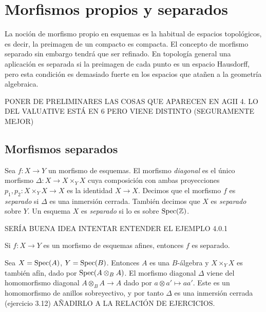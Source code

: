 \documentclass[GA.tex]{subfiles}
\begin{document}

\chapter{Morfismos propios y separados}

La noción de morfismo propio en esquemas es la habitual de espacios topológicos, es decir, la preimagen de un compacto es compacta. El concepto de morfismo separado sin embargo tendrá que ser refinado. En topología general una aplicación es separada si la preimagen de cada punto es un espacio Hausdorff, pero esta condición es demasiado fuerte en los espacios que atañen a la geometría algebraica. 


PONER DE PRELIMINARES LAS COSAS QUE APARECEN EN AGII 4. LO DEL VALUATIVE ESTÁ EN 6 PERO VIENE DISTINTO (SEGURAMENTE MEJOR)
\section{Morfismos separados}


\begin{defi}
Sea $f:X\to Y$ un morfismo de esquemas. El morfismo \emph{diagonal} es el único morfismo $\Delta:X\to X\times_Y X$ cuya composición con ambas proyecciones $p_1,p_2:X\times_Y X\to X$ es la identidad $X\to X$. Decimos que el morfismo $f$ es \emph{separado} si $\Delta$ es una inmersión cerrada. También decimos que $X$ es \emph{separado} sobre $Y$. Un esquema $X$ es \emph{separado} si lo es sobre $\operatorname{Spec}(\mathbb{Z})$.  
\end{defi}

SERÍA BUENA IDEA INTENTAR ENTENDER EL EJEMPLO 4.0.1

\begin{prop}
Si $f:X\to Y$ es un morfismo de esquemas afines, entonces $f$ es separado.
\end{prop}
\begin{dem}
Sea $X=\operatorname{Spec}(A)$, $Y=\operatorname{Spec}(B)$. Entonces $A$ es una $B$-álgebra y $X\times_Y X$ es también afín, dado por $\operatorname{Spec}(A\otimes_B A)$. El morfismo diagonal $\Delta$ viene del homomorfismo diagonal $A\otimes_B A\to A$ dado por $a\otimes a'\mapsto aa'$. Este es un homomorfismo de anillos sobreyectivo, y por tanto $\Delta$ es una inmersión cerrada (ejercicio 3.12) AÑADIRLO A LA RELACIÓN DE EJERCICIOS.
\end{dem}
\end{document}
